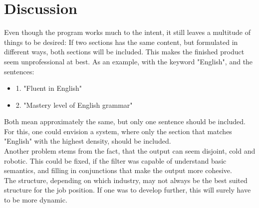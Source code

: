 \section{Discussion}\label{sec:discussion}
Even though the program works much to the intent, it still leaves a multitude of things to be desired:
If two sections has the same content, but formulated in different ways, both sections will be included.
This makes the finished product seem unprofessional at best. As an example, with the keyword "English", and the sentences:
\begin{itemize}
  \item 1. "Fluent in English"
  \item 2. "Mastery level of English grammar"
\end{itemize}
Both mean approximately the same, but only one sentence should be included. For this, one could envision a system, where only the section that matches "English" with the highest density, should be included.\\

Another problem stems from the fact, that the output can seem disjoint, cold and robotic. This could be fixed, if the filter was capable of understand basic semantics, and filling in conjunctions that make the output more cohesive.\\

The structure, depending on which industry, may not always be the best suited structure for the job position. If one was to develop further, this will surely have to be more dynamic.\\


\clearpage